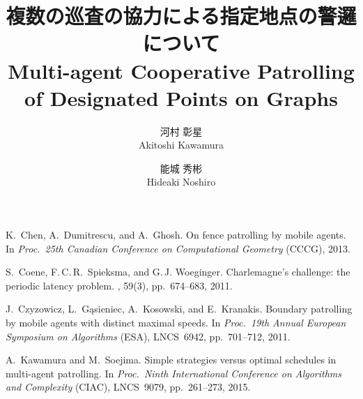 \documentclass[twocolumn, a4paper]{ieicejsp}
\title{{\bf 複数の巡査の協力による指定地点の警邏について}
	{\normalsize \\ Multi-agent Cooperative Patrolling of Designated Points on Graphs}}
\author{
		河村 彰星 \\ Akitoshi Kawamura \and
		能城 秀彬 \\ Hideaki Noshiro
	}
\begin{document}
\maketitle

%





\begin{thebibliography}{1}


K.~Chen, A.~Dumitrescu, and A.~Ghosh.
\newblock On fence patrolling by mobile agents.
\newblock In {\it Proc.\ 25th Canadian Conference on Computational Geometry} (CCCG), 2013.




S.~Coene, F.\,C.\,R.~Spieksma, and G.\,J. Woeginger.
\newblock Charlemagne's challenge: the periodic latency problem.
, 59(3), pp.~674--683, 2011.


J.~Czyzowicz, L.~G{\k{a}}sieniec, A.~Kosowski, and E.~Kranakis.
\newblock Boundary patrolling by mobile agents with distinct maximal speeds.
\newblock In {\it Proc.\ 19th Annual European Symposium on Algorithms} (ESA), LNCS~6942, pp.~701--712, 2011. 




A.~Kawamura and M.~Soejima.
\newblock Simple strategies versus optimal schedules in multi-agent patrolling.
\newblock In \emph{Proc.\ Ninth International Conference on Algorithms and Complexity} (CIAC), LNCS~9079, pp.~261--273, 2015.

\end{thebibliography}
\end{document}
